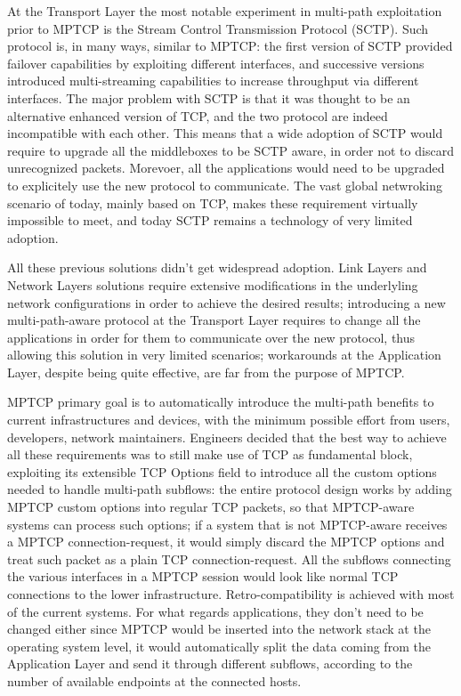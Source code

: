 At the Transport Layer the most notable experiment in multi-path exploitation prior to MPTCP is the Stream Control Transmission Protocol (SCTP). Such protocol is, in many ways, similar to MPTCP: the first version of SCTP provided failover capabilities by exploiting different interfaces, and successive versions introduced multi-streaming capabilities to increase throughput via different interfaces. The major problem with SCTP is that it was thought to be an alternative enhanced version of TCP, and the two protocol are indeed incompatible with each other. This means that a wide adoption of SCTP would require to upgrade all the middleboxes to be SCTP aware, in order not to discard unrecognized packets. Morevoer, all the applications would need to be upgraded to explicitely use the new protocol to communicate. The vast global netwroking scenario of today, mainly based on TCP, makes these requirement virtually impossible to meet, and today SCTP remains a technology of very limited adoption.


\vspace{5mm}
All these previous solutions didn't get widespread adoption. Link Layers and Network Layers solutions require extensive modifications in the underlyling network configurations in order to achieve the desired results; introducing a new multi-path-aware protocol at the Transport Layer requires to change all the applications in order for them to communicate over the new protocol, thus allowing this solution in very limited scenarios; workarounds at the Application Layer, despite being quite effective, are far from the purpose of MPTCP.


MPTCP primary goal is to automatically introduce the multi-path benefits to current infrastructures and devices, with the minimum possible effort from users, developers, network maintainers. Engineers decided that the best way to achieve all these requirements was to still make use of TCP as fundamental block, exploiting its extensible TCP Options field to introduce all the custom options needed to handle multi-path subflows: the entire protocol design works by adding MPTCP custom options into regular TCP packets, so that MPTCP-aware systems can process such options; if a system that is not MPTCP-aware receives a MPTCP connection-request, it would simply discard the MPTCP options and treat such packet as a plain TCP connection-request. All the subflows connecting the various interfaces in a MPTCP session would look like normal TCP connections to the lower infrastructure. Retro-compatibility is achieved with most of the current systems. For what regards applications, they don't need to be changed either since MPTCP would be inserted into the network stack at the operating system level, it would automatically split the data coming from the Application Layer and send it through different subflows, according to the number of available endpoints at the connected hosts.

